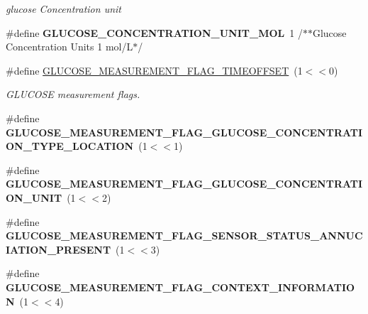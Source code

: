 \begin{DoxyCompactItemize}
\begin{DoxyCompactList}\small\item\em glucose Concentration unit \end{DoxyCompactList}\item 
\#define {\bfseries G\+L\+U\+C\+O\+S\+E\+\_\+\+C\+O\+N\+C\+E\+N\+T\+R\+A\+T\+I\+O\+N\+\_\+\+U\+N\+I\+T\+\_\+\+M\+OL}~1			/$\ast$$\ast$Glucose Concentration Units     1	mol/L$\ast$/\hypertarget{group___b_l_e___g_s_ga11e873a22897567a6aaacb2c35d26947}{}\label{group___b_l_e___g_s_ga11e873a22897567a6aaacb2c35d26947}

\item 
\#define \hyperlink{group___b_l_e___g_s_ga370292f9ec79040cc6bb1fab8a89f858}{G\+L\+U\+C\+O\+S\+E\+\_\+\+M\+E\+A\+S\+U\+R\+E\+M\+E\+N\+T\+\_\+\+F\+L\+A\+G\+\_\+\+T\+I\+M\+E\+O\+F\+F\+S\+ET}~(1$<$$<$0)\hypertarget{group___b_l_e___g_s_ga370292f9ec79040cc6bb1fab8a89f858}{}\label{group___b_l_e___g_s_ga370292f9ec79040cc6bb1fab8a89f858}

\begin{DoxyCompactList}\small\item\em G\+L\+U\+C\+O\+SE measurement flags. \end{DoxyCompactList}\item 
\#define {\bfseries G\+L\+U\+C\+O\+S\+E\+\_\+\+M\+E\+A\+S\+U\+R\+E\+M\+E\+N\+T\+\_\+\+F\+L\+A\+G\+\_\+\+G\+L\+U\+C\+O\+S\+E\+\_\+\+C\+O\+N\+C\+E\+N\+T\+R\+A\+T\+I\+O\+N\+\_\+\+T\+Y\+P\+E\+\_\+\+L\+O\+C\+A\+T\+I\+ON}~(1$<$$<$1)\hypertarget{group___b_l_e___g_s_gaba86fe13c4f2ca3bb4991483c5a9f415}{}\label{group___b_l_e___g_s_gaba86fe13c4f2ca3bb4991483c5a9f415}

\item 
\#define {\bfseries G\+L\+U\+C\+O\+S\+E\+\_\+\+M\+E\+A\+S\+U\+R\+E\+M\+E\+N\+T\+\_\+\+F\+L\+A\+G\+\_\+\+G\+L\+U\+C\+O\+S\+E\+\_\+\+C\+O\+N\+C\+E\+N\+T\+R\+A\+T\+I\+O\+N\+\_\+\+U\+N\+IT}~(1$<$$<$2)\hypertarget{group___b_l_e___g_s_ga13ea87b4ec4a39e657039bd607021edf}{}\label{group___b_l_e___g_s_ga13ea87b4ec4a39e657039bd607021edf}

\item 
\#define {\bfseries G\+L\+U\+C\+O\+S\+E\+\_\+\+M\+E\+A\+S\+U\+R\+E\+M\+E\+N\+T\+\_\+\+F\+L\+A\+G\+\_\+\+S\+E\+N\+S\+O\+R\+\_\+\+S\+T\+A\+T\+U\+S\+\_\+\+A\+N\+N\+U\+C\+I\+A\+T\+I\+O\+N\+\_\+\+P\+R\+E\+S\+E\+NT}~(1$<$$<$3)\hypertarget{group___b_l_e___g_s_ga3b4a48be6845f4d1fa7c556d5891ce24}{}\label{group___b_l_e___g_s_ga3b4a48be6845f4d1fa7c556d5891ce24}

\item 
\#define {\bfseries G\+L\+U\+C\+O\+S\+E\+\_\+\+M\+E\+A\+S\+U\+R\+E\+M\+E\+N\+T\+\_\+\+F\+L\+A\+G\+\_\+\+C\+O\+N\+T\+E\+X\+T\+\_\+\+I\+N\+F\+O\+R\+M\+A\+T\+I\+ON}~(1$<$$<$4)\hypertarget{group___b_l_e___g_s_ga136d37103ec637adcb4d782318f0e18f}{}\label{group___b_l_e___g_s_ga136d37103ec637adcb4d782318f0e18f}


\end{DoxyCompactItemize}
